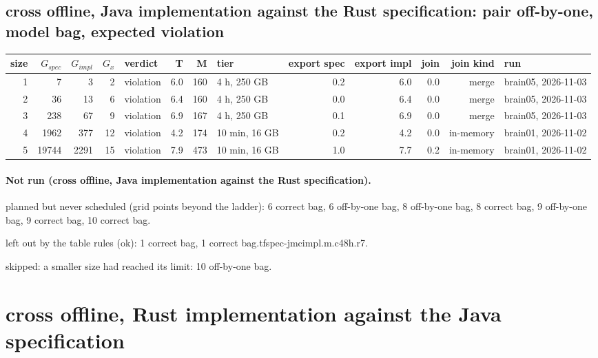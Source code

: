 \documentclass[10pt]{article}
\begin{document}
\subsection*{cross offline, Java implementation against the Rust specification: pair \textsf{off-by-one}, model bag, expected violation}
\begin{longtable}{@{}rrrrlrrlrrrrl@{}}
\toprule
size & $G_{\mathit{spec}}$ & $G_{\mathit{impl}}$ & $G_x$ & verdict & T & M & tier & export spec & export impl & join & join kind & run \\
\midrule
\endhead
\color{blue} 1 & 7 & 3 & 2 & violation & 6.0 & 160 & 4 h, 250 GB & 0.2 & 6.0 & 0.0 & merge & brain05, 2026-11-03 \\
\color{blue} 2 & 36 & 13 & 6 & violation & 6.4 & 160 & 4 h, 250 GB & 0.0 & 6.4 & 0.0 & merge & brain05, 2026-11-03 \\
\color{blue} 3 & 238 & 67 & 9 & violation & 6.9 & 167 & 4 h, 250 GB & 0.1 & 6.9 & 0.0 & merge & brain05, 2026-11-03 \\
\color{red} 4 & 1962 & 377 & 12 & violation & 4.2 & 174 & 10 min, 16 GB & 0.2 & 4.2 & 0.0 & in-memory & brain01, 2026-11-02 \\
\color{red} 5 & 19744 & 2291 & 15 & violation & 7.9 & 473 & 10 min, 16 GB & 1.0 & 7.7 & 0.2 & in-memory & brain01, 2026-11-02 \\
\bottomrule
\end{longtable}
\paragraph{Not run (cross offline, Java implementation against the Rust specification).}
planned but never scheduled (grid points beyond the ladder): 6 correct bag, 6 off-by-one bag, 8 off-by-one bag, 8 correct bag, 9 off-by-one bag, 9 correct bag, 10 correct bag.\par
left out by the table rules (ok): 1 correct bag, 1 correct bag.tfspec-jmcimpl.m.c48h.r7.\par
skipped: a smaller size had reached its limit: 10 off-by-one bag.\par
\section*{cross offline, Rust implementation against the Java specification}
\end{document}
